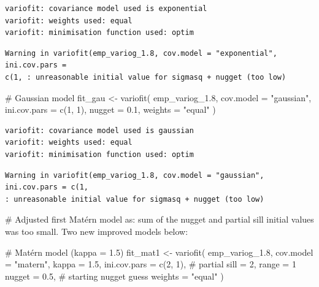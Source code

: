 \documentclass[
  11pt,
]{article}
\newenvironment{Shaded}{\begin{snugshade}}{\end{snugshade}}
\newcommand{\AttributeTok}[1]{\textcolor[rgb]{0.40,0.45,0.13}{#1}}
\newcommand{\CommentTok}[1]{\textcolor[rgb]{0.37,0.37,0.37}{#1}}
\newcommand{\DecValTok}[1]{\textcolor[rgb]{0.68,0.00,0.00}{#1}}
\newcommand{\FloatTok}[1]{\textcolor[rgb]{0.68,0.00,0.00}{#1}}
\newcommand{\FunctionTok}[1]{\textcolor[rgb]{0.28,0.35,0.67}{#1}}
\newcommand{\NormalTok}[1]{\textcolor[rgb]{0.00,0.23,0.31}{#1}}
\newcommand{\OtherTok}[1]{\textcolor[rgb]{0.00,0.23,0.31}{#1}}
\newcommand{\StringTok}[1]{\textcolor[rgb]{0.13,0.47,0.30}{#1}}
\begin{document}
\begin{verbatim}
variofit: covariance model used is exponential 
variofit: weights used: equal 
variofit: minimisation function used: optim 
\end{verbatim}

\begin{verbatim}
Warning in variofit(emp_variog_1.8, cov.model = "exponential", ini.cov.pars =
c(1, : unreasonable initial value for sigmasq + nugget (too low)
\end{verbatim}

\begin{Shaded}
\begin{Highlighting}[]
\CommentTok{\# Gaussian model}
\NormalTok{fit\_gau }\OtherTok{\textless{}{-}} \FunctionTok{variofit}\NormalTok{(}
\NormalTok{  emp\_variog\_1}\FloatTok{.8}\NormalTok{,}
  \AttributeTok{cov.model =} \StringTok{"gaussian"}\NormalTok{,}
  \AttributeTok{ini.cov.pars =} \FunctionTok{c}\NormalTok{(}\DecValTok{1}\NormalTok{, }\DecValTok{1}\NormalTok{),}
  \AttributeTok{nugget =} \FloatTok{0.1}\NormalTok{,}
  \AttributeTok{weights =} \StringTok{"equal"}
\NormalTok{)}
\end{Highlighting}
\end{Shaded}

\begin{verbatim}
variofit: covariance model used is gaussian 
variofit: weights used: equal 
variofit: minimisation function used: optim 
\end{verbatim}

\begin{verbatim}
Warning in variofit(emp_variog_1.8, cov.model = "gaussian", ini.cov.pars = c(1,
: unreasonable initial value for sigmasq + nugget (too low)
\end{verbatim}

\begin{Shaded}
\begin{Highlighting}[]
\CommentTok{\# Adjusted first Matérn model as: sum of the nugget and partial sill initial values was too small. Two new improved models below:}

\CommentTok{\# Matérn model (kappa = 1.5)}
\NormalTok{fit\_mat1 }\OtherTok{\textless{}{-}} \FunctionTok{variofit}\NormalTok{(}
\NormalTok{  emp\_variog\_1}\FloatTok{.8}\NormalTok{,}
  \AttributeTok{cov.model =} \StringTok{"matern"}\NormalTok{,}
  \AttributeTok{kappa =} \FloatTok{1.5}\NormalTok{,}
  \AttributeTok{ini.cov.pars =} \FunctionTok{c}\NormalTok{(}\DecValTok{2}\NormalTok{, }\DecValTok{1}\NormalTok{),   }\CommentTok{\# partial sill = 2, range = 1}
  \AttributeTok{nugget =} \FloatTok{0.5}\NormalTok{,             }\CommentTok{\# starting nugget guess}
  \AttributeTok{weights =} \StringTok{"equal"}
\NormalTok{)}
\end{Highlighting}
\end{Shaded}
\end{document}
